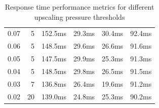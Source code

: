 \documentclass[draft,final]{vutinfth} %
\begin{document}
\begin{table}[]
\begin{tabular}{lrrrrr}
0.07                                                                              & 5                                                              & 152.5ms                                                     & 29.3ms                                                      & 30.4ms                                                         & 92.4ms                                                         \\
0.06                                                                              & 5                                                              & 148.5ms                                                     & 29.6ms                                                      & 26.6ms                                                         & 91.6ms                                                         \\
0.05                                                                              & 5                                                              & 147.5ms                                                     & 29.9ms                                                      & 25.3ms                                                         & 91.3ms                                                         \\
0.04                                                                              & 5                                                              & 148.5ms                                                     & 29.8ms                                                      & 26.5ms                                                         & 91.5ms                                                         \\
0.03                                                                              & 7                                                              & 136.8ms                                                     & 26.4ms                                                      & 19.6ms                                                         & 91.2ms                                                         \\
0.02                                                                              & 20                                                             & 139.0ms                                                     & 24.8ms                                                      & 25.3ms                                                         & 90.2ms                                                         \\ \hline
\end{tabular}
\caption{Response time performance metrics for different upscaling pressure thresholds}
\label{tab:osmotic_scaling_aggressiveness}
\end{table}
\end{document}
